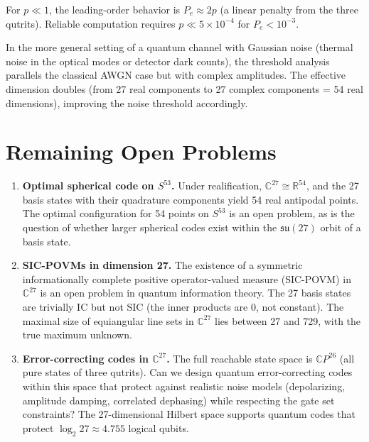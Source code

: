 \documentclass[12pt,a4paper]{article}
\begin{document}
For $p \ll 1$, the leading-order behavior is $P_e \approx 2p$ (a linear
penalty from the three qutrits). Reliable computation requires
$p \ll 5\times 10^{-4}$ for $P_e < 10^{-3}$.

In the more general setting of a quantum channel with Gaussian noise
(thermal noise in the optical modes or detector dark counts), the
threshold analysis parallels the classical AWGN case but with complex
amplitudes. The effective dimension doubles (from 27 real components to
27 complex components = 54 real dimensions), improving the noise
threshold accordingly.

\section{Remaining Open Problems}

\begin{enumerate}
\item \textbf{Optimal spherical code on $S^{53}$.} Under realification,
$\mathbb{C}^{27} \cong \mathbb{R}^{54}$, and the 27 basis states with
their quadrature components yield 54 real antipodal points. The optimal
configuration for 54 points on $S^{53}$ is an open problem, as is the
question of whether larger spherical codes exist within the $\mathfrak{su}(27)$
orbit of a basis state.

\item \textbf{SIC-POVMs in dimension 27.} The existence of a
symmetric informationally complete positive operator-valued measure
(SIC-POVM) in $\mathbb{C}^{27}$ is an open problem in quantum
information theory. The 27 basis states are trivially IC but not
SIC (the inner products are 0, not constant). The maximal size of
equiangular line sets in $\mathbb{C}^{27}$ lies between 27 and 729,
with the true maximum unknown.

\item \textbf{Error-correcting codes in $\mathbb{C}^{27}$.} The full
reachable state space is $\mathbb{C}P^{26}$ (all pure states of three
qutrits). Can we design quantum error-correcting codes within this
space that protect against realistic noise models (depolarizing,
amplitude damping, correlated dephasing) while respecting the gate
set constraints? The 27-dimensional Hilbert space supports quantum
codes that protect $\log_2 27 \approx 4.755$ logical qubits.


\end{enumerate}
\end{document}
